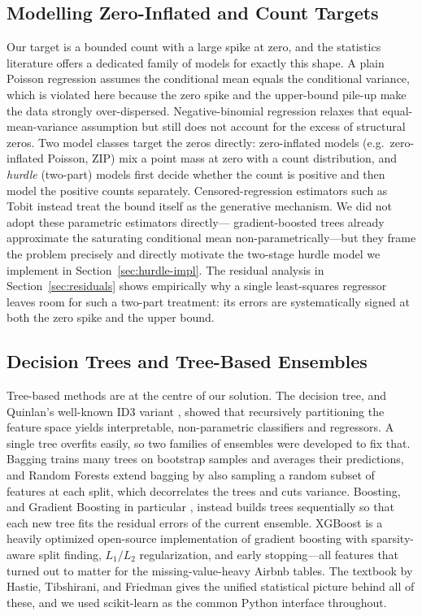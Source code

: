 \documentclass[journal]{IEEEtran}
\begin{document}
\subsection{Modelling Zero-Inflated and Count Targets}
\label{sec:zeroinflated}
Our target is a bounded count with a large spike at zero, and the statistics
literature offers a dedicated family of models for exactly this shape. A plain
Poisson regression assumes the conditional mean equals the conditional variance,
which is violated here because the zero spike and the upper-bound pile-up make
the data strongly over-dispersed. Negative-binomial regression relaxes that
equal-mean-variance assumption but still does not account for the excess of
structural zeros. Two model classes target the zeros directly: zero-inflated
models (e.g.\ zero-inflated Poisson, ZIP) mix a point mass at zero with a count
distribution, and \emph{hurdle} (two-part) models first decide whether the count
is positive and then model the positive counts separately. Censored-regression
estimators such as Tobit \cite{tobin1958} instead treat the bound itself as the
generative mechanism. We did not adopt these parametric estimators directly---
gradient-boosted trees already approximate the saturating conditional mean
non-parametrically---but they frame the problem precisely and directly
motivate the two-stage hurdle model we implement in
Section~\ref{sec:hurdle-impl}. The residual analysis in
Section~\ref{sec:residuals} shows empirically why a single least-squares
regressor leaves room for such a two-part treatment: its errors are systematically
signed at both the zero spike and the upper bound.

\subsection{Decision Trees and Tree-Based Ensembles}
Tree-based methods are at the centre of our solution. The decision tree, and
Quinlan's well-known ID3 variant
\cite{quinlan1986}, showed that recursively partitioning the feature space
yields interpretable, non-parametric classifiers and regressors. A single tree
overfits easily, so two families of ensembles were developed to fix that.
Bagging \cite{breiman1996} trains many trees on bootstrap samples and averages
their predictions, and Random Forests \cite{breiman2001} extend bagging by also
sampling a random subset of features at each split, which decorrelates the trees
and cuts variance. Boosting, and Gradient Boosting in particular
\cite{friedman2001}, instead builds trees sequentially so that each new tree
fits the residual errors of the current ensemble. XGBoost \cite{chen2016xgboost}
is a heavily optimized open-source implementation of gradient boosting with
sparsity-aware split finding, $L_1/L_2$ regularization, and early stopping---all
features that turned out to matter for the missing-value-heavy Airbnb tables.
The textbook by Hastie, Tibshirani, and Friedman \cite{hastie2009esl} gives the
unified statistical picture behind all of these, and we used scikit-learn
\cite{pedregosa2011sklearn} as the common Python interface throughout.
\end{document}

